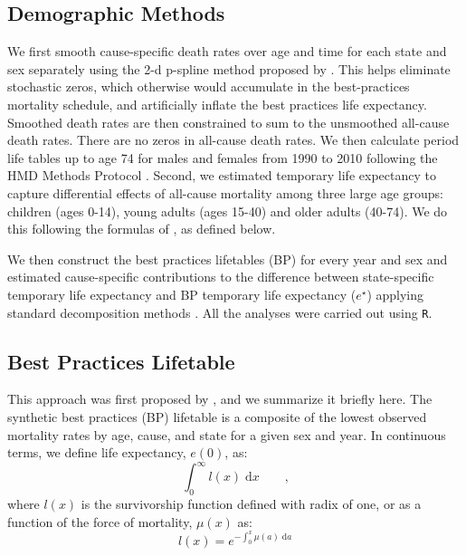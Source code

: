 \documentclass{article}
\newcommand{\dd}{\; \mathrm{d}}
\newcommand{\tc}{\quad\quad\text{,}}
\begin{document}
\subsection*{Demographic Methods}
We first smooth cause-specific death rates over age and time for each
state and sex separately using the 2-d p-spline method proposed by
\citet{GC2012}.
This helps eliminate stochastic zeros, which otherwise would accumulate in the best-practices mortality
schedule, and artificially inflate the best practices life expectancy. Smoothed death rates are
then constrained to sum to the unsmoothed all-cause death rates. There are no
zeros in all-cause death rates. We then calculate period life tables up to
age 74 for males and females from 1990 to 2010 following the HMD Methods
Protocol \citep{HMDMP}. Second, we estimated temporary life expectancy to
capture differential effects of all-cause mortality among three large age
groups: children (ages 0-14), young adults (ages 15-40) and older adults
(40-74). We do this following the formulas of \citet{arriaga1984}, as
defined below.

We then construct the best practices lifetables (BP) for every year and sex
and estimated cause-specific contributions to the difference between
state-specific temporary life expectancy and BP temporary life expectancy
($e^{\star}$) applying standard decomposition methods
\citep{horiuchi2008}. All the analyses were carried out
using \texttt{R}.

\subsection*{Best Practices Lifetable}
This approach was first proposed by \citet{whelpton1947}, and we summarize it
briefly here. The synthetic best practices (BP) lifetable is a composite of the
lowest observed mortality rates by age, cause, and state for a given sex and year. In continuous terms, we define life expectancy, $e(0)$, as:
\begin{equation}
\int _0 ^\infty l(x) \dd x \tc
\end{equation}
where $l(x)$ is the survivorship function defined with radix of one, or as a
function of the force of mortality, $\mu(x)$ as:
\begin{equation}
\label{eq:lx}
l(x) = e^{-\int_0^x \mu(a) \dd a}
\end{equation}
\end{document}

